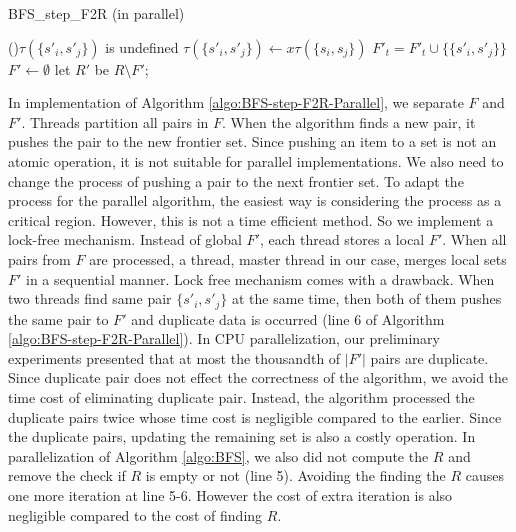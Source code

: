 \documentclass[12pt]{article}
\begin{document}
\begin{algorithm}[ht]
	\caption{BFS\_step\_F2R (in parallel)}
	\label{algo:BFS-step-F2R-Parallel}
	
	
	{
		{
			{
				\If(){$\tau({\{ s'_i,s'_j \}})$ is undefined}
				{
					$\tau(\{ s'_i,s'_j\}) \longleftarrow x \tau(\{ s_i,s_j \})$\;
					$F'_t = F'_t \cup \{ \{ s'_i,s'_j \}  \} $\;
				}
			}
		}
	}
	$F' \longleftarrow \emptyset$\;
	let $R'$ be $R \setminus F'$;
\end{algorithm}

In implementation of Algorithm \ref{algo:BFS-step-F2R-Parallel}, we separate $F$ and $F'$. Threads partition all pairs in $F$. When the algorithm finds a new pair, it pushes the pair to the new frontier set. Since pushing an item to a set is not an atomic operation, it is not suitable for parallel implementations. We also need to change the process of pushing a pair to the next frontier set. To adapt the process for the parallel algorithm, the easiest way is considering the process as a critical region. However, this is not a time efficient method. So we implement a lock-free mechanism. Instead of global $F'$, each thread stores a local $F'$. When all pairs from $F$ are processed, a thread, master thread in our case, merges local sets $F'$ in a sequential manner. Lock free mechanism comes with a drawback. When two threads find same pair $\{ s'_i,s'_j\}$ at the same time, then both of them pushes the same pair to $F'$ and duplicate data is occurred (line 6 of Algorithm \ref{algo:BFS-step-F2R-Parallel}). In CPU parallelization, our preliminary experiments presented that at most the thousandth of $|F'|$ pairs are duplicate. Since duplicate pair does not effect the correctness of the algorithm, we avoid the time cost of eliminating duplicate pair. Instead, the algorithm processed the duplicate pairs twice whose time cost is negligible compared to the earlier. Since the duplicate pairs, updating the remaining set is also a costly operation. In parallelization of Algorithm \ref{algo:BFS}, we also did not compute the $R$ and remove the check if $R$ is empty  or not (line 5). Avoiding the finding the $R$ causes one more iteration at line 5-6. However the cost of extra iteration is also negligible compared to the cost of finding $R$.
\end{document}
